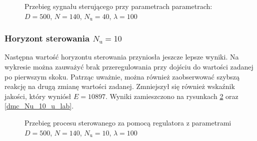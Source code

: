 \begin{figure}[b]
    \centering
    \caption{Przebieg sygnału sterującego przy parametrach parametrach: $D = 500$, $N = 140$, $N_{\mathrm{u}} = 40$, $\lambda = 100$}
    \label{dmc_Nu_40_u}
\end{figure}

\subsubsection{Horyzont sterowania $N_{\mathrm{u}} = 10$}
Następna wartość horyzontu sterowania przyniosła jeszcze lepsze wyniki. Na wykresie można zauważyć brak przeregulowania przy dojściu do wartości zadanej po pierwszym skoku. Patrząc uważnie, można również zaobserwować szybszą reakcję na drugą zmianę wartości zadanej. Zmniejszył się również wskaźnik jakości, który wyniósł $E = \num{10897}$. Wyniki zamieszczono na rysunkach \ref{dmc_Nu_10_y} oraz \ref{dmc_Nu_10_u_lab}.

\begin{figure}[t]
    \centering
    \caption{Przebieg procesu sterowanego za pomocą regulatora z parametrami $D = 500$, $N = 140$, $N_{\mathrm{u}} = 10$, $\lambda = 100$}
    \label{dmc_Nu_10_y}
\end{figure}

